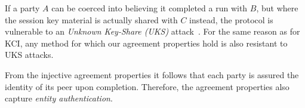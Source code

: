 
If a party $A$ can be coerced into believing it completed a run with $B$, but
where the session key material is actually shared with $C$ instead, the 
protocol is vulnerable to an \emph{Unknown Key-Share (UKS)}
attack~\cite{DBLP:conf/ima/Blake-WilsonJM97}.
%
For the same reason as for KCI, any method for which our agreement
properties hold is also resistant to UKS attacks.
%

From the injective agreement properties it follows that each party is assured
the identity of its peer upon completion.
%
Therefore, the agreement properties also capture \emph{entity authentication}.
%


